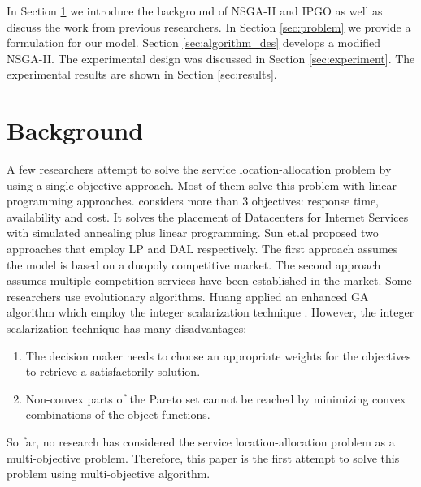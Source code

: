 \documentclass{llncs}
\begin{document}
In Section \ref{sec:Background} we introduce the background of NSGA-II and IPGO as well as discuss the work from previous researchers.
In Section \ref{sec:problem} we provide a formulation for our model. Section \ref{sec:algorithm_des} develops a modified NSGA-II. 
The experimental design was discussed in Section \ref{sec:experiment}. The experimental results are shown in Section \ref{sec:results}.


\section{Background}
\label{sec:Background}
A few researchers attempt to solve the service location-allocation problem by using a single objective approach. Most of them solve this problem with linear programming approaches.
\cite{5961695} considers more than 3 objectives: response time, availability and cost. 
It solves the placement of Datacenters for Internet Services with simulated annealing plus linear programming. 
Sun et.al proposed two approaches \cite{Aboolian} \cite{Sun} that employ LP and DAL respectively. 
The first approach \cite{Aboolian} assumes the model is based on a duopoly competitive market.
The second approach \cite{Sun} assumes multiple competition services have been established in the market.
Some researchers use evolutionary algorithms. Huang \cite{EnhancedGenetic} applied an enhanced GA algorithm which employ the integer scalarization technique \cite{Multiobjective}. However, 
the integer scalarization technique has many disadvantages:
\begin{enumerate}
	\item The decision maker needs to choose an appropriate weights for the objectives to retrieve a satisfactorily solution.
	\item Non-convex parts of the Pareto set cannot be reached by minimizing convex combinations of the object functions.
\end{enumerate}

So far, no research has considered the service location-allocation problem as a multi-objective problem. Therefore, this paper is the first attempt to solve this problem using 
multi-objective algorithm.
\end{document}
